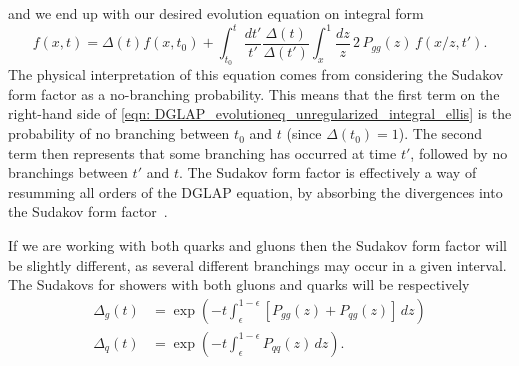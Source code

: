 \documentclass[main.tex]{subfiles}
\begin{document}
and we end up with our desired evolution equation on integral form
\begin{equation}\label{eqn: DGLAP_evolutioneq_unregularized_integral_ellis} %
    f(x,t) = \Delta(t) f(x,t_0) + \int_{t_0}^{t} \frac{dt'}{t'} \frac{\Delta(t)}{\Delta(t')} \int_{x}^{1} \frac{dz}{z} \,2\, P_{gg}(z) \, f(x/z, t').
\end{equation}
The physical interpretation of this equation comes from considering the Sudakov form factor as a no-branching probability. This means that the first term on the right-hand side of \autoref{eqn: DGLAP_evolutioneq_unregularized_integral_ellis} is the probability of no branching between \(t_0\) and \(t\) (since \(\Delta(t_0)=1\)). The second term then represents that some branching has occurred at time \(t'\), followed by no branchings between \(t'\) and \(t\). The Sudakov form factor is effectively a way of resumming all orders of the DGLAP equation, by absorbing the divergences into the Sudakov form factor~\cite{schwartz2014quantum}. %

If we are working with both quarks and gluons then the Sudakov form factor will be slightly different, as several different branchings may occur in a given interval. The Sudakovs for showers with both gluons and quarks will be respectively
\begin{align}
    \Delta_{g}(t) &= \exp\left(-t \int_\epsilon^{1-\epsilon} \left[P_{gg}(z)+P_{qg}(z) \right] \, dz \right)  \label{eqn: sudakov_vacuum_gluons}  \\
    \Delta_{q}(t) &= \exp\left(-t \int_\epsilon^{1-\epsilon} P_{qq}(z) \, dz \right). \label{eqn: sudakov_vacuum_quarks}
\end{align}
\end{document}
